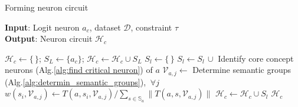 \begin{algorithm}[H]
    \caption{Forming neuron circuit}
    \textbf{Input}: Logit neuron $a_c$, dataset $\mathcal{D}$, constraint $\tau$ \\
    \textbf{Output}: Neuron circuit $\mathcal{H}_c$
    \begin{algorithmic}[0]
        \STATE $\mathcal{H}_c \leftarrow \{\,\}$; $S_L \leftarrow \{a_c\}$; $\mathcal{H}_c \leftarrow \mathcal{H}_c \cup S_L$
        \STATE $S_l \leftarrow \{\,\}$
        \STATE $S_l \leftarrow S_l \, \cup$ Identify core concept neurons (Alg.\ref{alg:find critical neuron}) of $a$ 
        \STATE $\mathcal{V}_{a,j} \leftarrow$ Determine semantic groups (Alg.\ref{alg:determin_semantic_groups}), $\: \forall j$
        \STATE $w(s_i, \mathcal{V}_{a,j}) \leftarrow T(a, s_i, \mathcal{V}_{a,j})/\sum_{s\in \mathbb{S}_a} \|T(a, s, \mathcal{V}_{a,j})\|$
        \ENDFOR
        \STATE $\mathcal{H}_c \leftarrow \mathcal{H}_c \cup S_l$
        \ENDFOR
        \RETURN $\mathcal{H}_c$
    \end{algorithmic}\label{algo:neuron circuit}
\end{algorithm}


